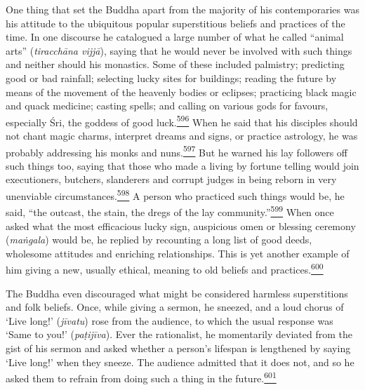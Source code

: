 One thing that set the Buddha apart from the majority of his
contemporaries was his attitude to the ubiquitous popular superstitious
beliefs and practices of the time. In one discourse he catalogued a
large number of what he called ``animal arts'' (\emph{tiracchāna
vijjā}), saying that he would never be involved with such things and
neither should his monastics. Some of these included palmistry;
predicting good or bad rainfall; selecting lucky sites for buildings;
reading the future by means of the movement of the heavenly bodies or
eclipses; practicing black magic and quack medicine; casting spells; and
calling on various gods for favours, especially Śri, the goddess of good
luck.\label{footprints_split_015.html_fnref596}\hyperref[footprints_split_025.htmlux5cux23fn596]{\textsuperscript{596}}
When he said that his disciples should not chant magic charms, interpret
dreams and signs, or practice astrology, he was probably addressing his
monks and
nuns.\label{footprints_split_015.html_fnref597}\hyperref[footprints_split_025.htmlux5cux23fn597]{\textsuperscript{597}}
But he warned his lay followers off such things too, saying that those
who made a living by fortune telling would join executioners, butchers,
slanderers and corrupt judges in being reborn in very unenviable
circumstances.\label{footprints_split_015.html_fnref598}\hyperref[footprints_split_025.htmlux5cux23fn598]{\textsuperscript{598}}
A person who practiced such things would be, he said, ``the outcast, the
stain, the dregs of the lay
community.''\label{footprints_split_015.html_fnref599}\hyperref[footprints_split_025.htmlux5cux23fn599]{\textsuperscript{599}}
When once asked what the most efficacious lucky sign, auspicious omen or
blessing ceremony (\emph{maṅgala}) would be, he replied by recounting a
long list of good deeds, wholesome attitudes and enriching
relationships. This is yet another example of him giving a new, usually
ethical, meaning to old beliefs and
practices.\label{footprints_split_015.html_fnref600}\hyperref[footprints_split_025.htmlux5cux23fn600]{\textsuperscript{600}}

The Buddha even discouraged what might be considered harmless
superstitions and folk beliefs. Once, while giving a sermon, he sneezed,
and a loud chorus of `Live long!' (\emph{jīvatu}) rose from the
audience, to which the usual response was `Same to you!'
(\emph{paṭijīva}). Ever the rationalist, he momentarily deviated from
the gist of his sermon and asked whether a person's lifespan is
lengthened by saying `Live long!' when they sneeze. The audience
admitted that it does not, and so he asked them to refrain from doing
such a thing in the
future.\label{footprints_split_015.html_fnref601}\hyperref[footprints_split_025.htmlux5cux23fn601]{\textsuperscript{601}}

